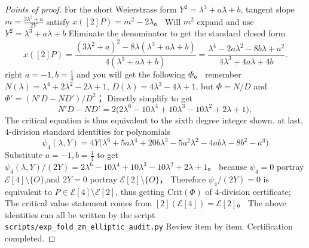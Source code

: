 \begin{proof}[Points of proof]
For the short Weierstrass form \(Y^{2}=\lambda^{3}+a\lambda+b\), tangent slope
\(
m=\frac{3\lambda^{2}+a}{2Y}
\)
satisfy \(x([2]P)=m^{2}-2\lambda\)。
Will \(m^{2}\) expand and use \(Y^{2}=\lambda^{3}+a\lambda+b\) Eliminate the denominator to get the standard closed form
\[
x([2]P)=\frac{(3\lambda^{2}+a)^{2}-8\lambda(\lambda^{3}+a\lambda+b)}{4(\lambda^{3}+a\lambda+b)}
=\frac{\lambda^{4}-2a\lambda^{2}-8b\lambda+a^{2}}{4\lambda^{3}+4a\lambda+4b}.
\]
right \(a=-1,b=\tfrac14\) and you will get the following \(\Phi\)。
remember
\(
N(\lambda)=\lambda^{4}+2\lambda^{2}-2\lambda+1
\),
\(
D(\lambda)=4\lambda^{3}-4\lambda+1
\),
but \(\Phi=N/D\) and
\(
\Phi'=(N'D-ND')/D^{2}
\)；
Directly simplify to get
\[
N'D-ND'
=2\bigl(2\lambda^{6}-10\lambda^{4}+10\lambda^{3}-10\lambda^{2}+2\lambda+1\bigr),
\]
The critical equation is thus equivalent to the sixth degree integer shown.
at last,\(4\)-division standard identities for polynomials
\[
\psi_{4}(\lambda,Y)=4Y\bigl(\lambda^{6}+5a\lambda^{4}+20b\lambda^{3}-5a^{2}\lambda^{2}-4ab\lambda-8b^{2}-a^{3}\bigr)
\]
Substitute \(a=-1,b=\tfrac14\) to get
\(
\psi_{4}(\lambda,Y)/(2Y)=2\lambda^{6}-10\lambda^{4}+10\lambda^{3}-10\lambda^{2}+2\lambda+1
\)。
because \(\psi_{4}=0\) portray \(\mathcal{E}[4]\setminus\{O\}\),and \(2Y=0\) portray \(\mathcal{E}[2]\setminus\{O\}\)，
Therefore \(\psi_{4}/(2Y)=0\) is equivalent to \(P\in\mathcal{E}[4]\setminus\mathcal{E}[2]\), thus getting \(\mathrm{Crit}(\Phi)\) of \(4\)-division certificate;
The critical value statement comes from \([2](\mathcal{E}[4])=\mathcal{E}[2]\)。
The above identities can all be written by the script \texttt{scripts/exp\_fold\_zm\_elliptic\_audit.py} Review item by item. Certification completed.
\end{proof}

